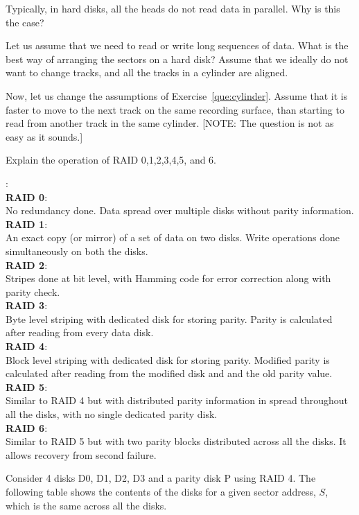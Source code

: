 \begin{ExerciseList}
\Exercise
Typically, in hard disks, all the heads do not read data in parallel. Why is this the case?

\Exercise
\label{que:cylinder}
Let us assume that we need to read or write long sequences of data. What is the best way of arranging
the sectors on a hard disk? Assume that we ideally do not want to change tracks, and all the tracks in a cylinder
are aligned.

\Exercise[difficulty=1]
Now, let us change the assumptions of Exercise~\ref{que:cylinder}. Assume that it is faster to move to the next track
on the same recording surface, than starting to read from another track in the same cylinder. [NOTE: The question is
not as easy as it sounds.]


\Exercise
Explain the operation of RAID 0,1,2,3,4,5, and 6.

\Answer:\\
{\bf RAID 0}:\\
No redundancy done. Data spread over multiple disks without parity information.\\
{\bf RAID 1}:\\
An exact copy (or mirror) of a set of data on two disks. Write operations done simultaneously on both the disks.\\
{\bf RAID 2}:\\
Stripes done at bit level, with Hamming code for error correction along with parity check.\\
{\bf RAID 3}:\\
Byte level striping with dedicated disk for storing parity. Parity is calculated after reading from every data disk.\\
{\bf RAID 4}:\\
Block level striping with dedicated disk for storing parity. Modified parity is calculated after reading from the modified disk and and the old parity value. \\
{\bf RAID 5}:\\
Similar to RAID 4 but with distributed parity information in spread throughout all the disks, with no single dedicated parity disk.\\
{\bf RAID 6}:\\
Similar to RAID 5 but with two parity blocks distributed across all the disks. It allows recovery from second failure.

 
\Exercise
 
Consider 4 disks D0, D1, D2, D3 and a parity disk P using RAID 4. The following table shows the contents of the disks
for a given sector address, $S$, which is the same across all the disks.


\end{ExerciseList}
